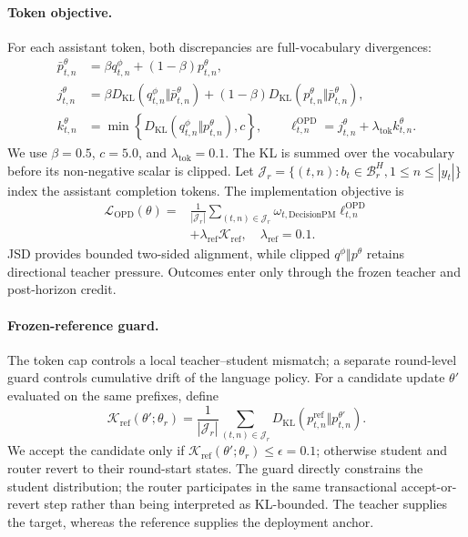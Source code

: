 \paragraph{Token objective.}
For each assistant token, both discrepancies are full-vocabulary divergences:
\begin{equation}
\label{eq:opd_token}
\begin{aligned}
\bar p_{t,n}^{\theta}
&=\beta q_{t,n}^{\phi}
+(1-\beta)p_{t,n}^{\theta},\\
j_{t,n}^{\theta}
&=\beta D_{\mathrm{KL}}(
q_{t,n}^{\phi}\Vert\bar p_{t,n}^{\theta})
+(1-\beta)D_{\mathrm{KL}}(
p_{t,n}^{\theta}\Vert\bar p_{t,n}^{\theta}),\\
k_{t,n}^{\theta}
&=\min\!\left\{
D_{\mathrm{KL}}(q_{t,n}^{\phi}\Vert p_{t,n}^{\theta}),c
\right\},
\qquad
\ell_{t,n}^{\mathrm{OPD}}=j_{t,n}^{\theta}
+\lambda_{\mathrm{tok}}k_{t,n}^{\theta}.
\end{aligned}
\end{equation}
We use $\beta=0.5$, $c=5.0$, and $\lambda_{\mathrm{tok}}=0.1$. The KL is summed over the vocabulary before its non-negative scalar is clipped. Let $\mathcal J_r=\{(t,n):b_t\in\mathcal B_r^H,1\leq n\leq|y_t|\}$ index the assistant completion tokens. The implementation objective is
\begin{equation}
\label{eq:opd_loss}
\begin{aligned}
\mathcal L_{\mathrm{OPD}}(\theta)={}&
\frac{1}{|\mathcal J_r|}
\sum_{(t,n)\in\mathcal J_r}
\omega_{t,\mathrm{DecisionPM}}\ell_{t,n}^{\mathrm{OPD}}\\
&+\lambda_{\mathrm{ref}}\mathcal K_{\mathrm{ref}},
\quad \lambda_{\mathrm{ref}}=0.1.
\end{aligned}
\end{equation}
JSD provides bounded two-sided alignment, while clipped $q^\phi\Vert p^\theta$ retains directional teacher pressure. Outcomes enter only through the frozen teacher and post-horizon credit.

\paragraph{Frozen-reference guard.}
The token cap controls a local teacher--student mismatch; a separate round-level guard controls cumulative drift of the language policy. For a candidate update $\theta'$ evaluated on the same prefixes, define
\begin{equation}
\label{eq:reference_kl}
\mathcal K_{\mathrm{ref}}(\theta';\theta_r)=
\frac{1}{|\mathcal J_r|}
\sum_{(t,n)\in\mathcal J_r}
D_{\mathrm{KL}}(p_{t,n}^{\mathrm{ref}}\Vert
p_{t,n}^{\theta'}).
\end{equation}
We accept the candidate only if $\mathcal K_{\mathrm{ref}}(\theta';\theta_r)\leq\epsilon=0.1$; otherwise student and router revert to their round-start states. The guard directly constrains the student distribution; the router participates in the same transactional accept-or-revert step rather than being interpreted as KL-bounded. The teacher supplies the target, whereas the reference supplies the deployment anchor.

